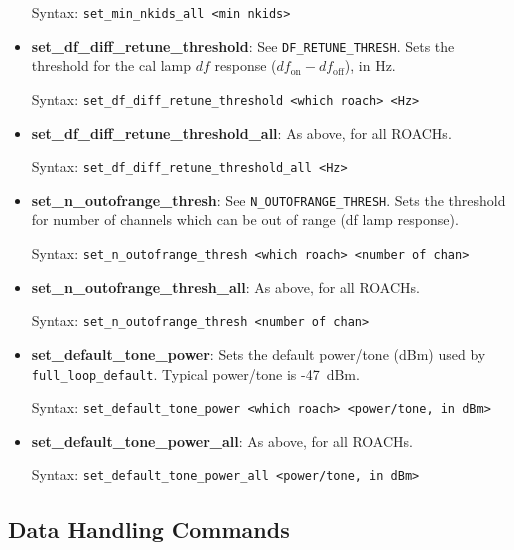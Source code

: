 \begin{itemize}[leftmargin=*,label={}]
Syntax: \texttt{set\_min\_nkids\_all <min nkids>}

\item \textbf{set\_df\_diff\_retune\_threshold}: See \texttt{DF\_RETUNE\_THRESH}. Sets the threshold for the cal lamp $df$ response ($df_{\mathrm{on}} - df_{\mathrm{off}}$), in Hz.

Syntax: \texttt{set\_df\_diff\_retune\_threshold <which roach> <Hz>}

\item \textbf{set\_df\_diff\_retune\_threshold\_all}: As above, for all ROACHs.

Syntax: \texttt{set\_df\_diff\_retune\_threshold\_all <Hz>}

\item \textbf{set\_n\_outofrange\_thresh}: See \texttt{N\_OUTOFRANGE\_THRESH}. Sets the threshold for number of channels which can be out of range (df lamp response).

Syntax: \texttt{set\_n\_outofrange\_thresh <which roach> <number of chan>}

\item \textbf{set\_n\_outofrange\_thresh\_all}: As above, for all ROACHs.

Syntax: \texttt{set\_n\_outofrange\_thresh <number of chan>}

\item \textbf{set\_default\_tone\_power}: Sets the default power/tone (dBm) used by \texttt{full\_loop\_default}. Typical power/tone is -47~dBm.

Syntax: \texttt{set\_default\_tone\_power <which roach> <power/tone, in dBm>}

\item \textbf{set\_default\_tone\_power\_all}: As above, for all ROACHs.

Syntax: \texttt{set\_default\_tone\_power\_all <power/tone, in dBm>}

\end{itemize}

\subsection{  Data Handling Commands}

